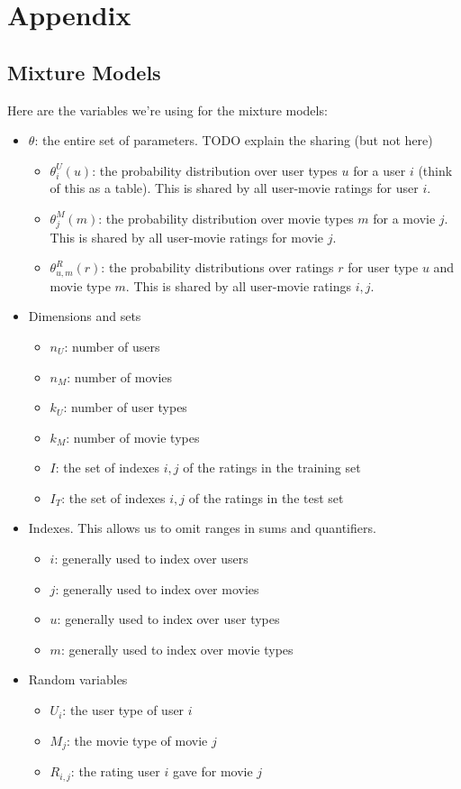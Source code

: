 \documentclass{article}
\begin{document}
\section{Appendix}

\subsection{Mixture Models}
\label{sec:appendix-mixture}

Here are the variables we're using for the mixture models:

\begin{itemize}
\item $\theta$: the entire set of parameters. TODO explain the sharing
  (but not here)
  \begin{itemize}
  \item $\theta^U_i(u)$: the probability distribution over user types
    $u$ for a user $i$ (think
    of this as a table). This is shared by all user-movie ratings for
    user $i$.
  \item $\theta^M_j(m)$: the probability distribution over movie
    types $m$ for a movie $j$. This is shared by all user-movie ratings for movie $j$.
  \item $\theta^R_{u,m}(r)$: the probability distributions over
    ratings $r$ for user type $u$ and movie type $m$. This is shared
    by all user-movie ratings $i,j$.
  \end{itemize}
\item Dimensions and sets
  \begin{itemize}
  \item $n_U$: number of users
  \item $n_M$: number of movies
  \item $k_U$: number of user types
  \item $k_M$: number of movie types
  \item $I$: the set of indexes $i,j$ of the ratings in the training
    set
  \item $I_T$: the set of indexes $i,j$ of the ratings in the test set
  \end{itemize}
\item Indexes. This allows us to omit ranges in sums and quantifiers.
  \begin{itemize}
  \item $i$: generally used to index over users
  \item $j$: generally used to index over movies
  \item $u$: generally used to index over user types
  \item $m$: generally used to index over movie types
  \end{itemize}
\item Random variables
  \begin{itemize}
  \item $U_i$: the user type of user $i$
  \item $M_j$: the movie type of movie $j$
  \item $R_{i,j}$: the rating user $i$ gave for movie $j$
  \end{itemize}
\end{itemize}

\footnotesize


\end{document}

